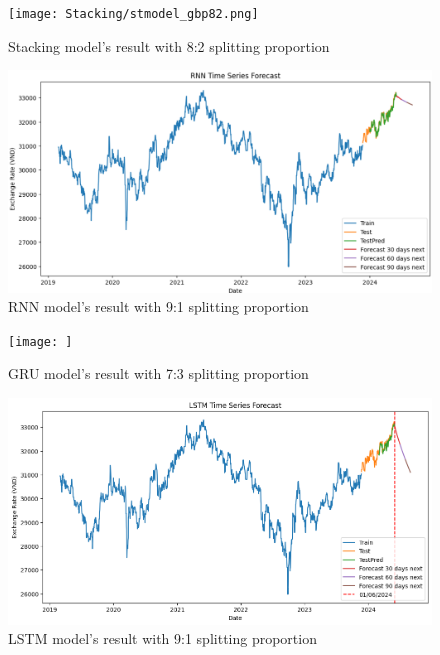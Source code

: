 \documentclass{ieeeojies}
\begin{document}
\begin{figure}[H]
  \centering
  \begin{minipage}{0.8\linewidth}
    \centering
    \texttt{[image: Stacking/stmodel\_gbp82.png]}
    \caption{Stacking model's result with 8:2 splitting proportion}
    \label{fig21}
  \end{minipage}
\end{figure}
\begin{figure}[H]
  \centering
  \begin{minipage}{0.8\linewidth}
    \centering
    \includegraphics[width=\linewidth]{RNN/rnn_gbp_91.png}
    \caption{RNN model's result with 9:1 splitting proportion}
    \label{fig22}
  \end{minipage}
\end{figure}
\begin{figure}[H]
  \centering
  \begin{minipage}{0.8\linewidth}
    \centering
    \texttt{[image: ]}
    \caption{GRU model's result with 7:3 splitting proportion}
    \label{fig23}
  \end{minipage}
\end{figure}
\begin{figure}[H]
  \centering
  \begin{minipage}{0.8\linewidth}
    \centering
    \includegraphics[width=\linewidth]{LSTM/lstm_gbp91.png}
    \caption{LSTM model's result with 9:1 splitting proportion}
    \label{fig24}
  \end{minipage}
\end{figure}
\end{document}
